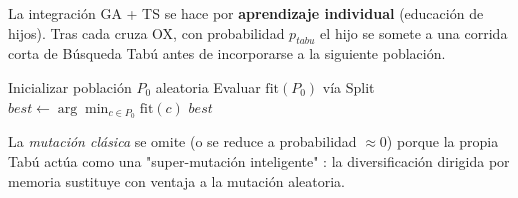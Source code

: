 La integración GA + TS se hace por \textbf{aprendizaje individual} (educación de hijos). Tras cada cruza OX, con probabilidad $p_{tabu}$ el hijo se somete a una corrida corta de Búsqueda Tabú antes de incorporarse a la siguiente población.

\begin{algorithm}[H]
\SetAlgoLined
\caption{Algoritmo Memético GA + Tabú para CVRP}
Inicializar población $P_0$ aleatoria\;
Evaluar $\mathrm{fit}(P_0)$ vía Split\;
$best \leftarrow \arg\min_{c \in P_0} \mathrm{fit}(c)$\;
\Return $best$\;
\end{algorithm}

La \emph{mutación clásica} se omite (o se reduce a probabilidad $\approx 0$) porque la propia Tabú actúa como una "super-mutación inteligente" \cite{moscato1989evolution}: la diversificación dirigida por memoria sustituye con ventaja a la mutación aleatoria.
